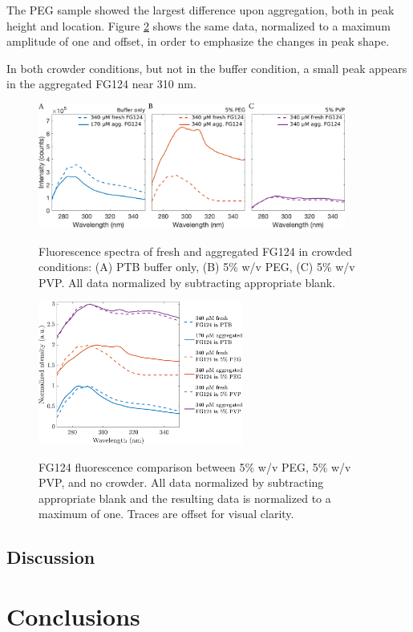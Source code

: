 The PEG sample showed the largest difference upon aggregation, both in peak height and location.  Figure \ref{fig:stacked-FG124-fluorimetry} shows the same data, normalized to a maximum amplitude of one and offset, in order to emphasize the changes in peak shape.

In both crowder conditions, but not in the buffer condition, a small peak appears in the aggregated FG124 near 310 nm.

\begin{figure}
\caption[FG124 fluorescence in crowded conditions.]{Fluorescence spectra of fresh and aggregated FG124 in crowded conditions: (A) PTB buffer only, (B) 5\% w/v PEG, (C) 5\% w/v PVP.  All data normalized by subtracting appropriate blank.}
\centering
\includegraphics[width=0.9\textwidth]{figs/ch05/FG124-fresh-vs-agg.pdf}
\label{fig:FG124-fresh-vs-agg}
\end{figure}

\begin{figure}
\caption[FG124 fluorescence comparison between crowding agents.]{FG124 fluorescence comparison between 5\% w/v PEG, 5\% w/v PVP, and no crowder.  All data normalized by subtracting appropriate blank and the resulting data is normalized to a maximum of one.  Traces are offset for visual clarity.\\}
\centering
\includegraphics[width=0.6\textwidth]{figs/ch05/stacked-FG124-fluorimetry.pdf}
\label{fig:stacked-FG124-fluorimetry}
\end{figure}

\subsection{Discussion}

\section{Conclusions}


